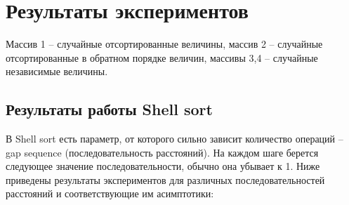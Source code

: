 \documentclass[a4paper,12pt,titlepage,finall]{article}
\begin{document}
\section{Результаты экспериментов}
Массив 1 -- случайные отсортированные величины, массив 2 -- случайные отсортированные в обратном порядке величин, массивы 3,4 -- случайные независимые величины.
\subsection{Результаты работы Shell sort}
В Shell sort есть параметр, от которого сильно зависит количество операций -- gap sequence (последовательность расстояний). На каждом шаге берется следующее значение последовательности, обычно она убывает к 1. Ниже приведены результаты экспериментов для различных последовательностей расстояний и соответствующие им асимптотики:

\begin{table}[H]
\centering
{}
\caption{последовательность расстояний \,\protect$\{\frac{n}{2^k}\}_{k=1}^{\log_2n}$}
\end{table}
\end{document}
